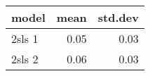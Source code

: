 \begin{tabular}{lrr}
  \hline
model & mean & std.dev \\ 
  \hline
2sls 1 & 0.05 & 0.03 \\ 
  2sls 2 & 0.06 & 0.03 \\ 
   \hline
\end{tabular}
